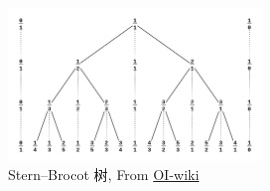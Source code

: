 \begin{figure}[h]
    \centering
    \includegraphics[width=0.6\textwidth]{img/stern-brocot1.png}
    \caption{Stern--Brocot 树, From \href{https://oi-wiki.org/math/number-theory/stern-brocot}{OI-wiki}}
\end{figure}
